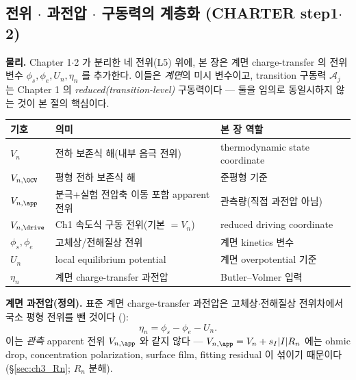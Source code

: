 \subsection{전위 $\cdot$ 과전압 $\cdot$ 구동력의 계층화 (CHARTER step1$\cdot$2)}\label{sec:ch3_potentials}
\textbf{물리.} Chapter 1$\cdot$2 가 분리한 네 전위(L5) 위에, 본 장은 계면 charge-transfer 의 전위 변수
$\phi_s,\phi_e,U_n,\eta_n$ 를 추가한다. 이들은 \emph{계면}의 미시 변수이고, transition 구동력 $\mathcal A_j$ 는
Chapter 1 의 \emph{reduced(transition-level)} 구동력이다 — 둘을 임의로 동일시하지 않는 것이 본 절의 핵심이다.
{\setlength{\tabcolsep}{4pt}
\begin{longtable}{p{} >{\raggedright\arraybackslash}p{} >{\raggedright\arraybackslash}p{}}
\toprule 기호 & 의미 & 본 장 역할 \\ \midrule \endhead
$V_n$ & 전하 보존식 해(내부 음극 전위) & thermodynamic state coordinate \\
$V_{n,\OCV}$ & 평형 전하 보존식 해 & 준평형 기준 \\
$V_{n,\app}$ & 분극+실험 전압축 이동 포함 apparent 전위 & 관측량(직접 과전압 아님) \\
$V_{n,\drive}$ & Ch1 속도식 구동 전위(기본 $=V_n$) & reduced driving coordinate \\
$\phi_s,\phi_e$ & 고체상/전해질상 전위 & 계면 kinetics 변수 \\
$U_n$ & local equilibrium potential & 계면 overpotential 기준 \\
$\eta_n$ & 계면 charge-transfer 과전압 & Butler--Volmer 입력 \\
\bottomrule
\end{longtable}}
\textbf{계면 과전압(정의).} 표준 계면 charge-transfer 과전압은 고체상$\cdot$전해질상 전위차에서 국소 평형
전위를 뺀 것이다 \cite{bardfaulkner,newman}():
\begin{equation}
\eta_n=\phi_s-\phi_e-U_n.
\label{eq:ch3_eta_standard}
\end{equation}
이는 \emph{관측} apparent 전위 $V_{n,\app}$ 와 같지 않다 — $V_{n,\app}=V_n+s_I|I|R_n$ 에는 ohmic drop,
concentration polarization, surface film, fitting residual 이 섞이기 때문이다(\S\ref{sec:ch3_Rn}; $R_n$ 분해).

